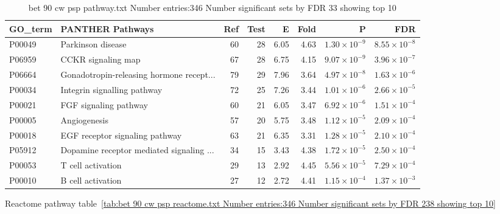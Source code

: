 \begin{table}[ht]
\centering
\begin{adjustbox}{width=\textwidth}
\begin{tabular}{llrrrrrr}
  \hline
GO\_term & PANTHER Pathways & Ref & Test & E & Fold & P & FDR \\ 
  \hline
P00049 & Parkinson disease  & 60 & 28 & 6.05 & 4.63 & $1.30 \times 10^{-9}$ & $8.55 \times 10^{-8}$ \\ 
  P06959 & CCKR signaling map  & 67 & 28 & 6.75 & 4.15 & $9.07 \times 10^{-9}$ & $3.96 \times 10^{-7}$ \\ 
  P06664 & Gonadotropin-releasing hormone recept... & 79 & 29 & 7.96 & 3.64 & $4.97 \times 10^{-8}$ & $1.63 \times 10^{-6}$ \\ 
  P00034 & Integrin signalling pathway  & 72 & 25 & 7.26 & 3.44 & $1.01 \times 10^{-6}$ & $2.66 \times 10^{-5}$ \\ 
  P00021 & FGF signaling pathway  & 60 & 21 & 6.05 & 3.47 & $6.92 \times 10^{-6}$ & $1.51 \times 10^{-4}$ \\ 
  P00005 & Angiogenesis  & 57 & 20 & 5.75 & 3.48 & $1.12 \times 10^{-5}$ & $2.09 \times 10^{-4}$ \\ 
  P00018 & EGF receptor signaling pathway  & 63 & 21 & 6.35 & 3.31 & $1.28 \times 10^{-5}$ & $2.10 \times 10^{-4}$ \\ 
  P05912 & Dopamine receptor mediated signaling ... & 34 & 15 & 3.43 & 4.38 & $1.72 \times 10^{-5}$ & $2.50 \times 10^{-4}$ \\ 
  P00053 & T cell activation  & 29 & 13 & 2.92 & 4.45 & $5.56 \times 10^{-5}$ & $7.29 \times 10^{-4}$ \\ 
  P00010 & B cell activation  & 27 & 12 & 2.72 & 4.41 & $1.15 \times 10^{-4}$ & $1.37 \times 10^{-3}$ \\ 
  \hline
\end{tabular}
\end{adjustbox}
\caption{bet 90 cw psp pathway.txt Number entries:346 Number significant sets by FDR 33 showing top 10} 
\label{tab:bet 90 cw psp pathway.txt Number entries:346 Number significant sets by FDR 33 showing top 10}
\end{table}

Reactome pathway table~\ref{tab:bet 90 cw psp reactome.txt Number entries:346 Number significant sets by FDR 238 showing top 10}


